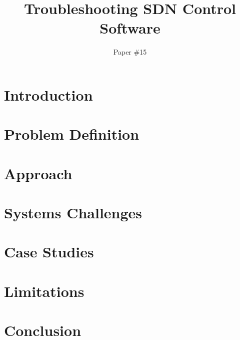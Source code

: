 \documentclass{sig-alt-hotnets}
\begin{document}
    \date{}

\title{Troubleshooting SDN Control Software}

\author{Paper \#15}

\date{}
    \maketitle
    \thispagestyle{empty}

\abstract{{\it }}

\section{Introduction}
\label{sec:intro}


\section{Problem Definition}
\label{sec:formalism}


\section{Approach}
\label{sec:approach}


\section{Systems Challenges}
\label{sec:systems_challenges}


\section{Case Studies}
\label{sec:casestudies}


\section{Limitations}
\label{sec:limitations}



\section{Conclusion}
\label{sec:conclusion}


\newpage
 

%
\end{document}

